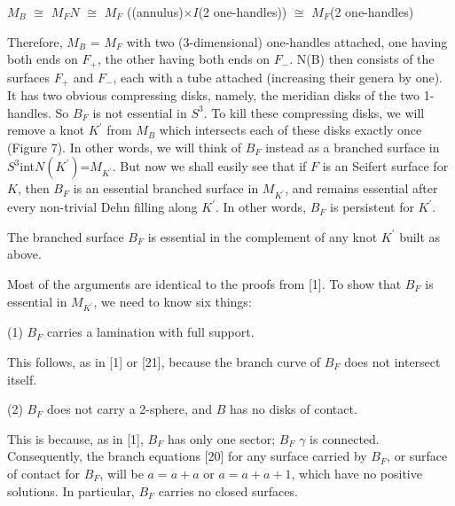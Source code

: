 \ssk

\leavevmode

\epsfxsize=2in
\centerline{{}}


\msk

$M_B$ $\cong$ $M_F$\up$N$ $\cong$ $M_F$ \up ((annulus)$\times 
I$\up(2 one-handles)) $\cong$ $M_F$\up(2 one-handles)

\msk

Therefore, $M_B$ = $M_F$ with two (3-dimensional) one-handles 
attached, one having both ends on $F_+$, the other having both ends 
on $F_-$. \delh N(B) then consists of the surfaces $F_+$ and $F_-$, 
each with a tube attached (increasing their genera by one). It has 
two obvious compressing disks, namely, the meridian disks of the two 
1-handles. So $B_F$ is not essential in $S^3$. To kill these compressing
disks, we will remove a knot $K^\prime$ from 
$M_B$ which intersects each of these disks exactly once (Figure 
7). In other words, we will think of $B_F$ instead as a branched surface in
$S^3$\smin int$N(K^\prime)$=$M_{K^\prime}$. But now we shall easily see 
that if $F$ is an  
Seifert surface for $K$, then $B_F$ is an essential branched surface 
in $M_{K^\prime}$, and remains essential after every non-trivial Dehn 
filling along $K^\prime$. In other words, $B_F$ is persistent for 
$K^\prime$.

The branched surface $B_F$ is essential in the complement
of any knot $K^\prime$ built as above.
\endproclaim

Most of the arguments are identical to the proofs from [1]. To show 
that $B_F$ is essential in $M_{K^\prime}$, we need to know six things:

\msk

(1)  $B_F$ carries a lamination with full support.

\ssk

This follows, as in [1] or [21], because the branch curve of $B_F$ does 
not intersect itself.

\msk

(2) $B_F$ does not carry a 2-sphere, and $B$ has no disks of contact.

\ssk

This is because, as in [1], $B_F$ has only one sector; $B_F$\smin 
$\gamma$ is connected. Consequently, the branch equations [20] for any
surface carried by $B_F$, or surface of contact for $B_F$, will
be $a=a+a$ or $a=a+a+1$, which have no positive solutions.
In particular, $B_F$ carries no closed surfaces.

